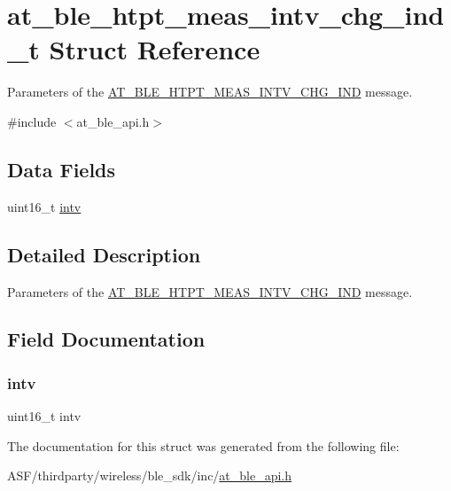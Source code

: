 \hypertarget{structat__ble__htpt__meas__intv__chg__ind__t}{}\section{at\+\_\+ble\+\_\+htpt\+\_\+meas\+\_\+intv\+\_\+chg\+\_\+ind\+\_\+t Struct Reference}
\label{structat__ble__htpt__meas__intv__chg__ind__t}


Parameters of the \mbox{\hyperlink{at__ble__api_8h_a3324640b95f33169515f89738ed5baeba9b2f15e66716a923925adf9bb4f4c1e2}{A\+T\+\_\+\+B\+L\+E\+\_\+\+H\+T\+P\+T\+\_\+\+M\+E\+A\+S\+\_\+\+I\+N\+T\+V\+\_\+\+C\+H\+G\+\_\+\+I\+ND}} message.  




{\ttfamily \#include $<$at\+\_\+ble\+\_\+api.\+h$>$}

\subsection*{Data Fields}
\begin{DoxyCompactItemize}
\item 
uint16\+\_\+t \mbox{\hyperlink{structat__ble__htpt__meas__intv__chg__ind__t_a0240debbc3420454fe136feb2b4403d3}{intv}}
\end{DoxyCompactItemize}


\subsection{Detailed Description}
Parameters of the \mbox{\hyperlink{at__ble__api_8h_a3324640b95f33169515f89738ed5baeba9b2f15e66716a923925adf9bb4f4c1e2}{A\+T\+\_\+\+B\+L\+E\+\_\+\+H\+T\+P\+T\+\_\+\+M\+E\+A\+S\+\_\+\+I\+N\+T\+V\+\_\+\+C\+H\+G\+\_\+\+I\+ND}} message. 

\subsection{Field Documentation}
\mbox{\label{structat__ble__htpt__meas__intv__chg__ind__t_a0240debbc3420454fe136feb2b4403d3}} 
\subsubsection{\texorpdfstring{intv}{intv}}
{\footnotesize\ttfamily uint16\+\_\+t intv}



The documentation for this struct was generated from the following file\+:\begin{DoxyCompactItemize}
\item 
A\+S\+F/thirdparty/wireless/ble\+\_\+sdk/inc/\mbox{\hyperlink{at__ble__api_8h}{at\+\_\+ble\+\_\+api.\+h}}\end{DoxyCompactItemize}
